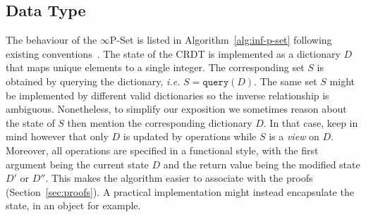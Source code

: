 \documentclass[11pt, oneside]{article}   	%
\begin{document}
\subsection{Data Type}
\label{sec:data-type}

The behaviour of the $\infty$P-Set is listed in Algorithm~\ref{alg:inf-p-set} following existing conventions~\cite{shapiro:inria-00555588}.  The state of the CRDT is implemented as a dictionary $D$ that 
maps unique elements to a single integer. The corresponding set $S$ is obtained by querying the dictionary, \textit{i.e.} $S=\texttt{query}(D)$. The same set $S$ might be implemented by different valid dictionaries so the inverse relationship is ambiguous. Nonetheless, to simplify our exposition we sometimes reason about the state of $S$ then mention the corresponding dictionary $D$. In that case, keep in mind however that only $D$ is updated by operations while $S$ is a \textit{view} on $D$. Moreover, all operations are specified in a functional style, with the first argument being the current state $D$ and the return value being the modified state $D'$ or $D''$. This makes the algorithm easier to associate with the proofs (Section~\ref{sec:proofs}). A practical implementation might instead encapsulate the state, in an object for example.
\end{document}
